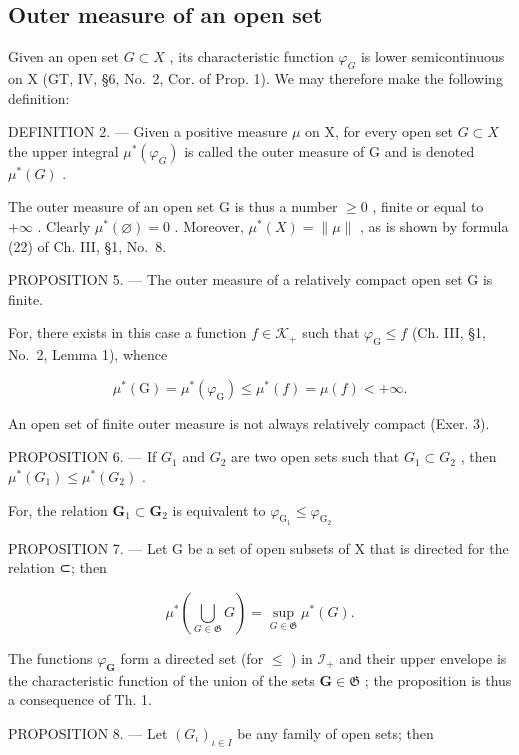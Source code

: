 \subsection{Outer measure of an open set}

Given an open set \(G \subset X\) , its characteristic function \(\varphi_{G}\) is lower semicontinuous on X (GT, IV, §6, No.~2, Cor. of Prop. 1). We may therefore make the following definition:

DEFINITION 2. --- Given a positive measure \(\mu\) on X, for every open set \(G \subset X\) the upper integral \(\mu^{*}(\varphi_{G})\) is called the outer measure of G and is denoted \(\mu^{*}(G)\) .

The outer measure of an open set G is thus a number \(\geqslant0\) , finite or equal to \(+\infty\) . Clearly \(\mu^{*}(\varnothing)=0\) . Moreover, \(\mu^{*}(X)=\|\mu\|\) , as is shown by formula (22) of Ch. III, §1, No.~8.

PROPOSITION 5. --- The outer measure of a relatively compact open set G is finite.

For, there exists in this case a function \(f \in \mathcal{K}_+\) such that \(\varphi_{\mathrm{G}} \leqslant f\) (Ch. III, §1, No.~2, Lemma 1), whence

\[
\mu^ {*} (\mathrm{G}) = \mu^ {*} (\varphi_ {\mathrm{G}}) \leqslant \mu^ {*} (f) = \mu (f) <   + \infty .
\]

An open set of finite outer measure is not always relatively compact (Exer. 3).

PROPOSITION 6. --- If \(G_1\) and \(G_2\) are two open sets such that \(G_1 \subset G_2\) , then \(\mu^*(G_1) \leqslant \mu^*(G_2)\) .

For, the relation \(\mathbf{G}_1\subset \mathbf{G}_2\) is equivalent to \(\varphi_{\mathrm{G_1}}\leqslant \varphi_{\mathrm{G_2}}\)

PROPOSITION 7. --- Let G be a set of open subsets of X that is directed for the relation ⊂; then

\[
\mu^ {*} \left(\bigcup_ {G \in \mathfrak {G}} G\right) = \sup _ {G \in \mathfrak {G}} \mu^ {*} (G).\tag{5}
\]

The functions \(\varphi_{\mathbf{G}}\) form a directed set (for \(\leqslant\) ) in \(\mathcal{I}_{+}\) and their upper envelope is the characteristic function of the union of the sets \(\mathbf{G} \in \mathfrak{G}\) ; the proposition is thus a consequence of Th. 1.

PROPOSITION 8. --- Let \((G_{\iota})_{\iota \in I}\) be any family of open sets; then

